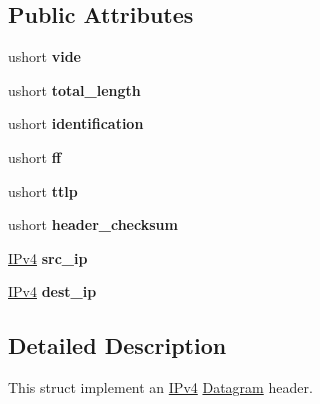 \subsection*{Public Attributes}
\begin{DoxyCompactItemize}
\item 
ushort {\bfseries vide}\hypertarget{structip_1_1Header_a105b752c949ecc83a6c64dec53b51e96}{}\label{structip_1_1Header_a105b752c949ecc83a6c64dec53b51e96}

\item 
ushort {\bfseries total\+\_\+length}\hypertarget{structip_1_1Header_ae3ae0942baa2544afa8b86b9677ce464}{}\label{structip_1_1Header_ae3ae0942baa2544afa8b86b9677ce464}

\item 
ushort {\bfseries identification}\hypertarget{structip_1_1Header_a6a1db0df8e25a4bcc0f2df9549bc30b1}{}\label{structip_1_1Header_a6a1db0df8e25a4bcc0f2df9549bc30b1}

\item 
ushort {\bfseries ff}\hypertarget{structip_1_1Header_a9c79b047f8384c0e78055dda3271598f}{}\label{structip_1_1Header_a9c79b047f8384c0e78055dda3271598f}

\item 
ushort {\bfseries ttlp}\hypertarget{structip_1_1Header_ad747dde10ed8db84dd6eec3e5e6e4619}{}\label{structip_1_1Header_ad747dde10ed8db84dd6eec3e5e6e4619}

\item 
ushort {\bfseries header\+\_\+checksum}\hypertarget{structip_1_1Header_a9c970e995fa43b87ed6be2a7e3b7e179}{}\label{structip_1_1Header_a9c970e995fa43b87ed6be2a7e3b7e179}

\item 
\hyperlink{structIPv4}{I\+Pv4} {\bfseries src\+\_\+ip}\hypertarget{structip_1_1Header_a0da2fcac6244ddb22e31efb81e3571a9}{}\label{structip_1_1Header_a0da2fcac6244ddb22e31efb81e3571a9}

\item 
\hyperlink{structIPv4}{I\+Pv4} {\bfseries dest\+\_\+ip}\hypertarget{structip_1_1Header_a3609ecc70b34815e28ef2f46708fe7ee}{}\label{structip_1_1Header_a3609ecc70b34815e28ef2f46708fe7ee}

\end{DoxyCompactItemize}


\subsection{Detailed Description}
This struct implement an \hyperlink{structIPv4}{I\+Pv4} \hyperlink{structip_1_1Datagram}{Datagram} header. 

